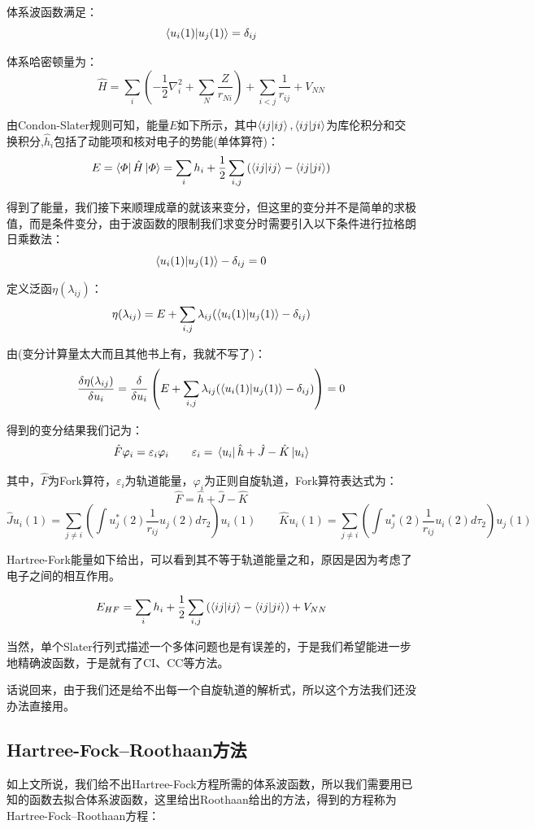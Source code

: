 体系波函数满足：
\[\bra{u_i(1)}\ket{u_j(1)}=\delta_{ij}\]

体系哈密顿量为：
\[\hat{H}=\sum_i\left(-\frac{1}{2}\nabla^2_i+\sum_N\frac{Z}{r_{Ni}}\right)+\sum_{i<j}\frac{1}{r_{ij}}+V_{NN}\]

由Condon-Slater规则可知，能量$E$如下所示，其中$\bra{ij}\ket{ij},\bra{ij}\ket{ji}$为库伦积分和交换积分,$\hat{h}_i$包括了动能项和核对电子的势能(单体算符)：
\[E=\bra{\varPhi}\hat{H}\ket{\varPhi}=\sum_ih_i+\frac{1}{2}\sum_{i,j}\left(\bra{ij}\ket{ij}-\bra{ij}\ket{ji}\right)\]

得到了能量，我们接下来顺理成章的就该来变分，但这里的变分并不是简单的求极值，而是条件变分，由于波函数的限制我们求变分时需要引入以下条件进行拉格朗日乘数法：
\[\bra{u_i(1)}\ket{u_j(1)}-\delta_{ij}=0\]

定义泛函$\eta(\lambda_{ij})$：
\[\eta(\lambda_{ij})=E+\sum_{i,j}\lambda_{ij}(\bra{u_i(1)}\ket{u_j(1)}-\delta_{ij})\]

由(变分计算量太大而且其他书上有，我就不写了)：
\[\frac{\delta\eta(\lambda_{ij})}{\delta u_i}=\frac{\delta}{\delta u_i}\left(E+\sum_{i,j}\lambda_{ij}(\bra{u_i(1)}\ket{u_j(1)}-\delta_{ij})\right)=0\]

得到的变分结果我们记为：
\[\hat{F}\varphi_i=\varepsilon_i\varphi_i \qquad \varepsilon_i=\bra*{u_i}\hat{h} + \hat{J} - \hat{K}\ket*{u_i}\]

其中，$\hat{F}$为Fork算符，$\varepsilon_i$为轨道能量，$\varphi_i$为正则自旋轨道，Fork算符表达式为：
\[\hat{F} = \hat{h} + \hat{J} - \hat{K}\]
\[\hat{J}u_i(1) = \sum_{j \neq i}\left(\int u_j^*(2)\frac{1}{r_{ij}}u_j(2)d\tau_2\right)u_i(1) \qquad \hat{K}u_i(1) = \sum_{j \neq i}\left(\int u_j^*(2)\frac{1}{r_{ij}}u_i(2)d\tau_2\right)u_j(1)\]

Hartree-Fork能量如下给出，可以看到其不等于轨道能量之和，原因是因为考虑了电子之间的相互作用。

\[E_{HF}=\sum_ih_i+\frac{1}{2}\sum_{i,j}\left(\bra{ij}\ket{ij}-\bra{ij}\ket{ji}\right)+V_{NN}\]

当然，单个Slater行列式描述一个多体问题也是有误差的，于是我们希望能进一步地精确波函数，于是就有了CI、CC等方法。

话说回来，由于我们还是给不出每一个自旋轨道的解析式，所以这个方法我们还没办法直接用。

\subsection{Hartree-Fock–Roothaan方法}
如上文所说，我们给不出Hartree-Fock方程所需的体系波函数，所以我们需要用已知的函数去拟合体系波函数，这里给出Roothaan给出的方法，得到的方程称为Hartree-Fock–Roothaan方程：

